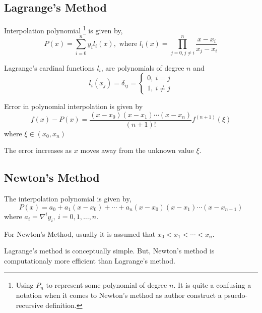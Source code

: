 \subsection{Lagrange's Method}
Interpolation polynomial
\footnote{
	Using $P_n$ to represent some polynomial of degree $n$.
	It is quite a confusing a notation when it comes to Newton's method as author construct a psuedo-recursive definition.
	}
	is given by,
\begin{equation}
	P(x) = \sum_{i=0}^n y_i l_i(x),\text{ where } l_i(x) = \prod_{j = 0,j \ne i}^n \frac{x-x_i}{x_j-x_i}
	\label{equ:lagrange}
\end{equation}
\begin{remark}
	Lagrange's cardinal functions $l_i$, are polynomials of degree $n$ and
	\[l_i(x_j) = \delta_{ij} = \begin{cases} 0,\ i = j \\ 1,\ i \ne j \end{cases}\]
\end{remark}
\begin{proposition}
	Error in polynomial interpolation is given by
	\begin{equation}
		f(x) - P(x) = \frac{(x-x_0)(x-x_1) \dotsm (x-x_n)}{(n+1)!} f^{(n+1)}(\xi)
		\label{equ:error}
	\end{equation}
	where $\xi \in (x_0, x_n)$
\end{proposition}
\begin{remark}
	The error increases as $x$ moves away from the unknown value $\xi$.
\end{remark}

\subsection{Newton's Method}
The interpolation polynomial is given by,
\begin{equation}
	P(x) = a_0 + a_1(x-x_0) + \dotsb + a_n(x-x_0)(x-x_1) \dotsm (x-x_{n-1})
	\label{equ:newton}
\end{equation}
where $a_i = \nabla^i y_i,\ i = 0,1,\dots,n$.
\begin{remark}
	For Newton's Method, usually it is assumed that $x_0 < x_1 < \dotsb < x_n$.
\end{remark}
\begin{remark}
	 Lagrange's method is conceptually simple.
	 But, Newton's method is computationaly more efficient than Lagrange's method.
\end{remark}
